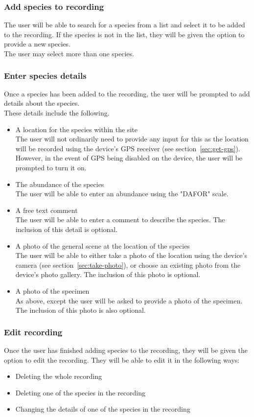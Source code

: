 \documentclass[12pt]{article}
\begin{document}
		\subsubsection{Add species to recording}
			The user will be able to search for a species from a list and select it to be added to the recording. If the species is not in the list, they will be given the option to provide a new species.\\
			The user may select more than one species.
		\subsubsection{Enter species details}
			\label{sec:enter-species-details}
			Once a species has been added to the recording, the user will be prompted to add details about the species.\\
			These details include the following.
			\begin{itemize}
				\item A location for the species within the site\\
				The user will not ordinarily need to provide any input for this as the location will be recorded using the device's GPS receiver (see section~\ref{sec:get-gps}). However, in the event of GPS being disabled on the device, the user will be prompted to turn it on.
				\item The abundance of the species\\
				The user will be able to enter an abundance using the "DAFOR" scale.
				\item A free text comment\\
				The user will be able to enter a comment to describe the species. The inclusion of this detail is optional.
				\item A photo of the general scene at the location of the species\\
				The user will be able to either take a photo of the location using the device's camera (see section~\ref{sec:take-photo}), or choose an existing photo from the device's photo gallery. The inclusion of this photo is optional.
				\item A photo of the specimen\\
				As above, except the user will be asked to provide a photo of the specimen. The inclusion of this photo is also optional.
			\end{itemize}
		\subsubsection{Edit recording}
			Once the user has finished adding species to the recording, they will be given the option to edit the recording. They will be able to edit it in the following ways:
			\begin{itemize}
				\item Deleting the whole recording
				\item Deleting one of the species in the recording
				\item Changing the details of one of the species in the recording
			\end{itemize}
\end{document}
